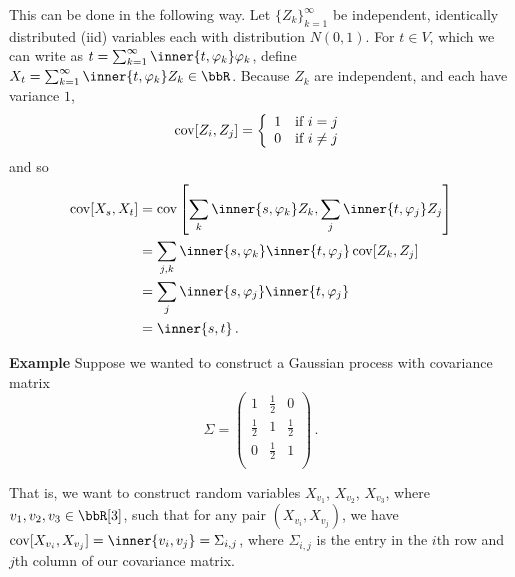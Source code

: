 \documentclass[../../../Master/AppliedStochastics.tex]{subfiles}
\begin{document}
\begin{enumerate}[(i)]
    This can be done in the following way.
    Let $\{Z_k\}_{k=1}^\infty$ be independent, identically distributed (iid)
        variables each with distribution $N(0, 1)$.
    For $t \in V$, which we can write as
        $t = \sum_{k = 1}^\infty \inner{t, \varphi_k} \varphi_k$,
        define $X_t = \sum_{k=1}^\infty \inner{t, \varphi_k} Z_k \in \bbR$.
    Because $Z_k$ are independent, and each have variance $1$,
    \begin{equation*}
        \operatorname{cov}[Z_i, Z_j] = \left\{\begin{array}{cc}
                            1 & \text{if } i = j \\
                            0 & \text{if } i \neq j \\
                         \end{array}\right.
    \end{equation*}
        and so
    \begin{align*}
        \cov[X_s, X_t] &= \cov\left[\sum_k \inner{s, \varphi_k} Z_k,
                            \sum_j \inner{t, \varphi_j} Z_j\right] \\
                       &= \sum_{j, k} \inner{s, \varphi_k} \inner{t, \varphi_j}
                            \cov[Z_k, Z_j] \\
                       &= \sum_j \inner{s, \varphi_j} \inner{t, \varphi_j} \\
                       &= \inner{s, t}\,.
    \end{align*}


    \textbf{Example}
    Suppose we wanted to construct a Gaussian process with covariance matrix
    \begin{equation*}
        \Sigma = \left(\begin{array}{ccc}
                1 & \frac{1}{2} & 0\\
                \frac{1}{2} & 1 & \frac{1}{2}\\
                0 & \frac{1}{2} & 1\\
                 \end{array}\right)\,.
    \end{equation*}
    
    
    That is, we want to construct random variables
        $X_{v_1}$, $X_{v_2}$, $X_{v_3}$, where $v_1, v_2, v_3 \in \bbR[3]$,
            such that for any pair $(X_{v_i}, X_{v_j})$, we have 
            $\cov[X_{v_i}, X_{v_j}] = \inner{v_i, v_j} = \Sigma_{i, j}$,
        where $\Sigma_{i, j}$ is the entry in the $i$th row and $j$th column
            of our covariance matrix.
    

\end{enumerate}
\end{document}
